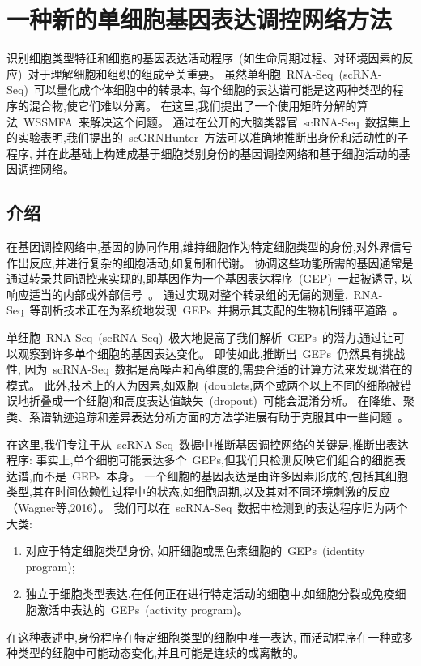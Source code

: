 \section{一种新的单细胞基因表达调控网络方法}

识别细胞类型特征和细胞的基因表达活动程序~(如生命周期过程、对环境因素的反应)~对于理解细胞和组织的组成至关重要。
虽然单细胞~RNA-Seq~(scRNA-Seq)~可以量化成个体细胞中的转录本,
每个细胞的表达谱可能是这两种类型的程序的混合物,使它们难以分离。
在这里,我们提出了一个使用矩阵分解的算法~WSSMFA~来解决这个问题。
通过在公开的大脑类器官~scRNA-Seq~数据集上的实验表明,我们提出的~scGRNHunter~方法可以准确地推断出身份和活动性的子程序, 
并在此基础上构建成基于细胞类别身份的基因调控网络和基于细胞活动的基因调控网络。


\subsection{介绍}
在基因调控网络中,基因的协同作用,维持细胞作为特定细胞类型的身份,对外界信号作出反应,并进行复杂的细胞活动,如复制和代谢。
协调这些功能所需的基因通常是通过转录共同调控来实现的,即基因作为一个基因表达程序~(GEP)~一起被诱导,
以响应适当的内部或外部信号~\cite{eisen1998cluster,segal2003module}。
通过实现对整个转录组的无偏的测量,~RNA-Seq~等剖析技术正在为系统地发现~GEPs~并揭示其支配的生物机制铺平道路~\cite{liberzon2015molecular}。

单细胞~RNA-Seq~(scRNA-Seq)~极大地提高了我们解析~GEPs~的潜力,通过让可以观察到许多单个细胞的基因表达变化。
即使如此,推断出~GEPs~仍然具有挑战性,
因为~scRNA-Seq~数据是高噪声和高维度的,需要合适的计算方法来发现潜在的模式。
此外,技术上的人为因素,如双胞~(doublets,两个或两个以上不同的细胞被错误地折叠成一个细胞)和高度表达值缺失~(dropout)~可能会混淆分析。
在降维、聚类、系谱轨迹追踪和差异表达分析方面的方法学进展有助于克服其中一些问题~\cite{amir2013visne,kharchenko2014bayesian,satija2015spatial,trapnell2014dynamics}。

在这里,我们专注于从~scRNA-Seq~数据中推断基因调控网络的关键是,推断出表达程序:
事实上,单个细胞可能表达多个~GEPs,但我们只检测反映它们组合的细胞表达谱,而不是~GEPs~本身。
一个细胞的基因表达是由许多因素形成的,包括其细胞类型,其在时间依赖性过程中的状态,如细胞周期,以及其对不同环境刺激的反应（Wagner等,2016）。
我们可以在~scRNA-Seq~数据中检测到的表达程序归为两个大类:
\begin{enumerate}
    \item 对应于特定细胞类型身份, 如肝细胞或黑色素细胞的~GEPs~(identity program);
    \item 独立于细胞类型表达,在任何正在进行特定活动的细胞中,如细胞分裂或免疫细胞激活中表达的~GEPs~(activity program)。
\end{enumerate}
在这种表述中,身份程序在特定细胞类型的细胞中唯一表达,
而活动程序在一种或多种类型的细胞中可能动态变化,并且可能是连续的或离散的。

